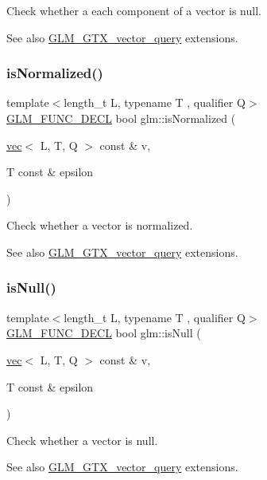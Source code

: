 Check whether a each component of a vector is null. \begin{DoxySeeAlso}{See also}
\mbox{\hyperlink{group__gtx__vector__query}{G\+L\+M\+\_\+\+G\+T\+X\+\_\+vector\+\_\+query}} extensions. 
\end{DoxySeeAlso}
\mbox{\label{group__gtx__vector__query_gac3c974f459fd75453134fad7ae89a39e}} 
\subsubsection{\texorpdfstring{is\+Normalized()}{isNormalized()}}
{\footnotesize\ttfamily template$<$length\+\_\+t L, typename T , qualifier Q$>$ \\
\mbox{\hyperlink{setup_8hpp_ab2d052de21a70539923e9bcbf6e83a51}{G\+L\+M\+\_\+\+F\+U\+N\+C\+\_\+\+D\+E\+CL}} bool glm\+::is\+Normalized (\begin{DoxyParamCaption}\item[{\mbox{\hyperlink{structglm_1_1vec}{vec}}$<$ L, T, Q $>$ const \&}]{v,  }\item[{T const \&}]{epsilon }\end{DoxyParamCaption})}

Check whether a vector is normalized. \begin{DoxySeeAlso}{See also}
\mbox{\hyperlink{group__gtx__vector__query}{G\+L\+M\+\_\+\+G\+T\+X\+\_\+vector\+\_\+query}} extensions. 
\end{DoxySeeAlso}
\mbox{\label{group__gtx__vector__query_gab4a3637dbcb4bb42dc55caea7a1e0495}} 
\subsubsection{\texorpdfstring{is\+Null()}{isNull()}}
{\footnotesize\ttfamily template$<$length\+\_\+t L, typename T , qualifier Q$>$ \\
\mbox{\hyperlink{setup_8hpp_ab2d052de21a70539923e9bcbf6e83a51}{G\+L\+M\+\_\+\+F\+U\+N\+C\+\_\+\+D\+E\+CL}} bool glm\+::is\+Null (\begin{DoxyParamCaption}\item[{\mbox{\hyperlink{structglm_1_1vec}{vec}}$<$ L, T, Q $>$ const \&}]{v,  }\item[{T const \&}]{epsilon }\end{DoxyParamCaption})}

Check whether a vector is null. \begin{DoxySeeAlso}{See also}
\mbox{\hyperlink{group__gtx__vector__query}{G\+L\+M\+\_\+\+G\+T\+X\+\_\+vector\+\_\+query}} extensions. 
\end{DoxySeeAlso}
